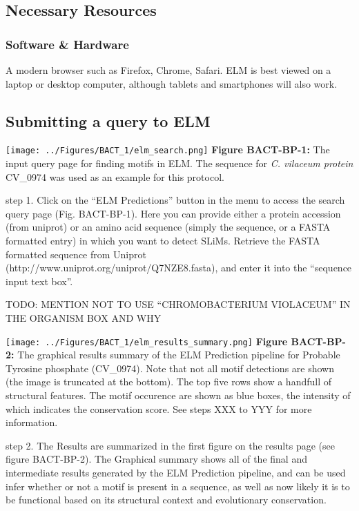 \subsection{Necessary Resources}\label{necessary-resources-1}

\subsubsection{Software \& Hardware}\label{software-hardware-1}

A modern browser such as Firefox, Chrome, Safari. ELM is best viewed on
a laptop or desktop computer, although tablets and smartphones will also
work.

\subsection{Submitting a query to ELM}\label{submitting-a-query-to-elm}

\texttt{[image: ../Figures/BACT\_1/elm\_search.png]} \textbf{Figure
BACT-BP-1:} The input query page for finding motifs in ELM. The sequence
for \emph{C. vilaceum protein} CV\_0974 was used as an example for this
protocol.

step 1. Click on the ``ELM Predictions'' button in the menu to access
the search query page (Fig. BACT-BP-1). Here you can provide either a
protein accession (from uniprot) or an amino acid sequence (simply the
sequence, or a FASTA formatted entry) in which you want to detect SLiMs.
Retrieve the FASTA formatted sequence from Uniprot
(http://www.uniprot.org/uniprot/Q7NZE8.fasta), and enter it into the
``sequence input text box''.

TODO: MENTION NOT TO USE ``CHROMOBACTERIUM VIOLACEUM'' IN THE ORGANISM
BOX AND WHY

\texttt{[image: ../Figures/BACT\_1/elm\_results\_summary.png]}
\textbf{Figure BACT-BP-2:} The graphical results summary of the ELM
Prediction pipeline for Probable Tyrosine phosphate (CV\_0974). Note
that not all motif detections are shown (the image is truncated at the
bottom). The top five rows show a handfull of structural features. The
motif occurence are shown as blue boxes, the intensity of which
indicates the conservation score. See steps XXX to YYY for more
information.

step 2. The Results are summarized in the first figure on the results
page (see figure BACT-BP-2). The Graphical summary shows all of the
final and intermediate results generated by the ELM Prediction pipeline,
and can be used infer whether or not a motif is present in a sequence,
as well as now likely it is to be functional based on its structural
context and evolutionary conservation.

